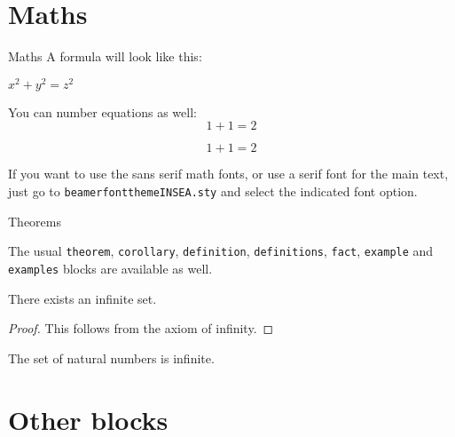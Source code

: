 \documentclass[usenames,dvipsnames,10pt,aspectratio=169]{beamer}
\begin{document}
\section{Maths}

\begin{frame}{Maths}
A formula will look like this: 
\begin{center}
 $x^2 + y^2 = z^2$
\end{center}

You can number equations as well:
\begin{equation}
1+1=2
\end{equation}

\begin{equation}
1+1=2 \tag{custom label!}
\end{equation}

\vskip 0.5cm

If you want to use the sans serif math fonts, or use a serif font for the main text, just go to \texttt{beamerfontthemeINSEA.sty} and select the indicated font option. 

\end{frame}

\begin{frame}{Theorems}

The usual \texttt{theorem}, \texttt{corollary}, \texttt{definition}, \texttt{definitions}, \texttt{fact}, \texttt{example} and \texttt{examples} blocks are available as well.

\begin{theorem}
There exists an infinite set.
\end{theorem}
\begin{proof}
This follows from the axiom of infinity.
\end{proof}
\begin{example}
The set of natural numbers is infinite. 
\end{example}

\end{frame}

\section{Other blocks}
\end{document}
